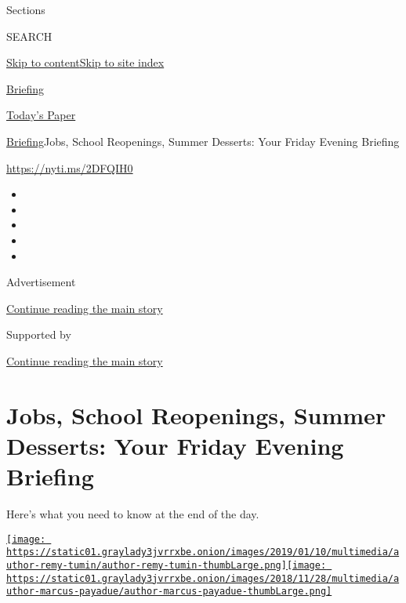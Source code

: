 Sections

SEARCH

\protect\hyperlink{site-content}{Skip to
content}\protect\hyperlink{site-index}{Skip to site index}

\href{https://www.nytimes3xbfgragh.onion/interactive/2018/briefing/global-morning-briefing-newsletter-signup.html}{Briefing}

\href{https://myaccount.nytimes3xbfgragh.onion/auth/login?response_type=cookie\&client_id=vi}{}

\href{https://www.nytimes3xbfgragh.onion/section/todayspaper}{Today's
Paper}

\href{/interactive/2018/briefing/global-morning-briefing-newsletter-signup.html}{Briefing}\textbar{}Jobs,
School Reopenings, Summer Desserts: Your Friday Evening Briefing

\href{https://nyti.ms/2DFQIH0}{https://nyti.ms/2DFQIH0}

\begin{itemize}
\item
\item
\item
\item
\item
\end{itemize}

Advertisement

\protect\hyperlink{after-top}{Continue reading the main story}

Supported by

\protect\hyperlink{after-sponsor}{Continue reading the main story}

\hypertarget{jobs-school-reopenings-summer-desserts-your-friday-evening-briefing}{%
\section{Jobs, School Reopenings, Summer Desserts: Your Friday Evening
Briefing}\label{jobs-school-reopenings-summer-desserts-your-friday-evening-briefing}}

Here's what you need to know at the end of the day.

\href{https://www.nytimes3xbfgragh.onion/by/remy-tumin}{\texttt{[image: https://static01.graylady3jvrrxbe.onion/images/2019/01/10/multimedia/author-remy-tumin/author-remy-tumin-thumbLarge.png]}}\href{https://www.nytimes3xbfgragh.onion/by/marcus-payadue}{\texttt{[image: https://static01.graylady3jvrrxbe.onion/images/2018/11/28/multimedia/author-marcus-payadue/author-marcus-payadue-thumbLarge.png]}}

